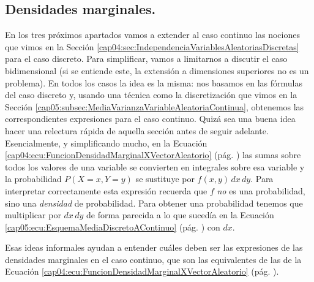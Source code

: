 %

\subsection{Densidades marginales.}
\label{cap05:subsec:DendidadesMarginales}

En los tres próximos apartados vamos a extender al caso continuo las nociones que vimos en la Sección \ref{cap04:sec:IndependenciaVariablesAleatoriasDiscretas} para el caso discreto. Para simplificar, vamos a limitarnos a discutir el caso bidimensional (si se entiende este, la extensión a dimensiones superiores no es un problema). En todos los casos la idea es la misma: nos basamos en las fórmulas del caso discreto y, usando una técnica como la discretización que vimos en la Sección \ref{cap05:subsec:MediaVarianzaVariableAleatoriaContinua}, obtenemos las correspondientes expresiones para el caso continuo. Quizá sea una buena idea hacer una relectura rápida de aquella sección antes de seguir adelante. Esencialmente, y simplificando mucho, en la Ecuación \ref{cap04:ecu:FuncionDensidadMarginalXVectorAleatorio} (pág. \pageref{cap04:ecu:FuncionDensidadMarginalXVectorAleatorio}) las sumas sobre todos los valores de una variable se convierten en integrales sobre esa variable y la probabilidad $P(X=x, Y=y)$ se sustituye por $f(x,y)\,dx\,dy$. Para interpretar correctamente esta expresión recuerda que $f$ {\em no} es una probabilidad, sino una {\em densidad} de probabilidad. Para obtener una probabilidad tenemos que multiplicar por $dx\,dy$ de forma parecida a lo que sucedía en la Ecuación \ref{cap05:ecu:EsquemaMediaDiscretoAContinuo} (pág. \pageref{cap05:ecu:EsquemaMediaDiscretoAContinuo}) con $dx$.

Esas ideas informales ayudan a entender cuáles deben ser las expresiones de las densidades marginales en el caso continuo, que son las equivalentes de las de la Ecuación \ref{cap04:ecu:FuncionDensidadMarginalXVectorAleatorio} (pág. \pageref{cap04:ecu:FuncionDensidadMarginalXVectorAleatorio}).

